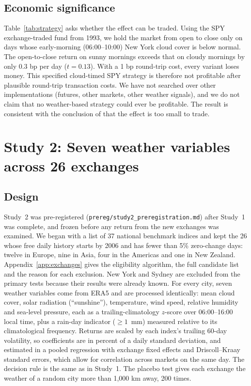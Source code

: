 \documentclass[11pt]{article}
\begin{document}
\subsection{Economic significance}

Table~\ref{tab:strategy} asks whether the effect can be traded. Using the SPY exchange-traded fund
from 1993, we hold the market from open to close only on days whose early-morning (06:00--10:00)
New York cloud cover is below normal. The open-to-close return on sunny mornings exceeds that on
cloudy mornings by only 0.3 bp per day ($t=0.13$). With a 1 bp round-trip cost, every variant
loses money. This specified cloud-timed SPY strategy is therefore not profitable after plausible
round-trip transaction costs. We have not searched over other implementations (futures, other
markets, other weather signals), and we do not claim that no weather-based strategy could ever be
profitable. The result is consistent with the conclusion of \citet{hirshleifer2003} that the
effect is too small to trade.



\section{Study 2: Seven weather variables across 26 exchanges}
\label{sec:study2}

\subsection{Design}

Study~2 was pre-registered (\texttt{prereg/study2\_preregistration.md}) after Study~1 was
complete, and frozen before any return from the new exchanges was examined. We began with a list
of 37 national benchmark indices and kept the 26 whose free daily history starts by 2006 and has
fewer than 5\% zero-change days: twelve in Europe, nine in Asia, four in the Americas and one in
New Zealand. Appendix~\ref{app:exchanges} gives the eligibility algorithm, the full candidate list
and the reason for each exclusion. New
York and Sydney are excluded from the primary tests because their results were already known. For
every city, seven weather variables come from ERA5 and are processed identically: mean cloud cover,
solar radiation (``sunshine''), temperature, wind speed, relative humidity and sea-level pressure,
each as a trailing-climatology $z$-score over 06:00--16:00 local time, plus a rain-day indicator
($\geq 1$~mm) measured relative to its climatological frequency. Returns are scaled by each index's
trailing 60-day volatility, so coefficients are in percent of a daily standard deviation, and
estimated in a pooled regression with exchange fixed effects and Driscoll--Kraay standard errors,
which allow for correlation across markets on the same day. The decision rule is the same as in
Study~1. The placebo test gives each exchange the weather of a random city more than 1,000 km
away, 200 times.
\end{document}
